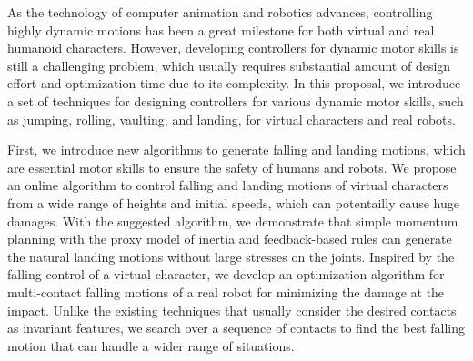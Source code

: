 \begin{summary}
  As the technology of computer animation and robotics advances,
  controlling highly dynamic motions
  has been a great milestone for both virtual and real humanoid characters.
  However, developing controllers for dynamic motor skills is still 
  a challenging problem, which usually requires substantial amount of 
  design effort and optimization time due to its complexity.
  In this proposal, we introduce a set of techniques for designing
  controllers for various dynamic motor skills, such as jumping, rolling, 
  vaulting, and landing, for virtual characters and real robots.

  First, we introduce new algorithms to generate falling and landing motions,
  which are essential motor skills to ensure the safety of humans and robots.
  We propose an online algorithm to control falling and landing motions 
  of virtual characters from a wide range of heights and initial speeds,
  which can potentailly cause huge damages.
  With the suggested algorithm, we demonstrate that simple momentum planning 
  with the proxy model of inertia and feedback-based rules can generate 
  the natural landing motions without large stresses on the joints.
  Inspired by the falling control of a virtual character, 
  we develop an optimization algorithm for multi-contact falling
  motions of a real robot for minimizing the damage at the impact.
  Unlike the existing techniques that usually consider the desired contacts 
  as invariant features, we search over a sequence of contacts to find
  the best falling motion that can handle a wider range of situations. 



\end{summary}

